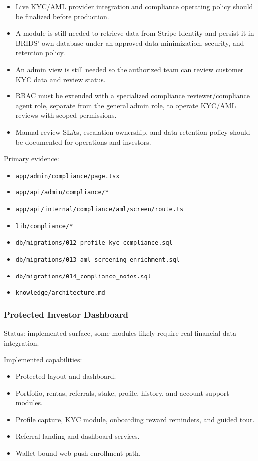 \documentclass[
  10pt,
  letterpaper,
]{article}
\providecommand{\tightlist}{%
  \setlength{\itemsep}{0pt}\setlength{\parskip}{0pt}}
\let\oldtexttt\texttt
\renewcommand{\texttt}[1]{\oldtexttt{\small #1}}
\begin{document}
\begin{itemize}
\tightlist
\item
  Live KYC/AML provider integration and compliance operating policy
  should be finalized before production.
\item
  A module is still needed to retrieve data from Stripe Identity and
  persist it in BRIDS' own database under an approved data minimization,
  security, and retention policy.
\item
  An admin view is still needed so the authorized team can review
  customer KYC data and review status.
\item
  RBAC must be extended with a specialized compliance
  reviewer/compliance agent role, separate from the general admin role,
  to operate KYC/AML reviews with scoped permissions.
\item
  Manual review SLAs, escalation ownership, and data retention policy
  should be documented for operations and investors.
\end{itemize}

Primary evidence:

\begin{itemize}
\tightlist
\item
  \texttt{app/admin/compliance/page.tsx}
\item
  \texttt{app/api/admin/compliance/*}
\item
  \texttt{app/api/internal/compliance/aml/screen/route.ts}
\item
  \texttt{lib/compliance/*}
\item
  \texttt{db/migrations/012\_profile\_kyc\_compliance.sql}
\item
  \texttt{db/migrations/013\_aml\_screening\_enrichment.sql}
\item
  \texttt{db/migrations/014\_compliance\_notes.sql}
\item
  \texttt{knowledge/architecture.md}
\end{itemize}

\subsubsection{Protected Investor
Dashboard}\label{protected-investor-dashboard}

Status: implemented surface, some modules likely require real financial
data integration.

Implemented capabilities:

\begin{itemize}
\tightlist
\item
  Protected layout and dashboard.
\item
  Portfolio, rentas, referrals, stake, profile, history, and account
  support modules.
\item
  Profile capture, KYC module, onboarding reward reminders, and guided
  tour.
\item
  Referral landing and dashboard services.
\item
  Wallet-bound web push enrollment path.
\end{itemize}
\end{document}

